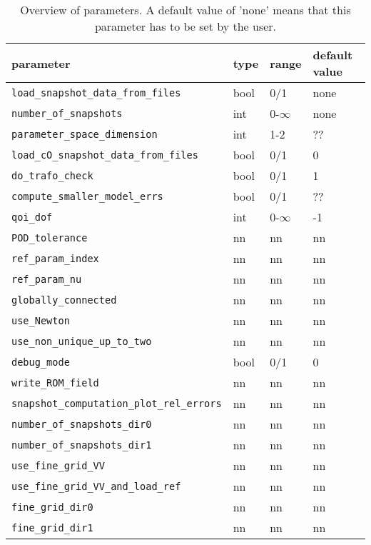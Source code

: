 \documentclass[a4paper,10pt]{article}
\begin{document}
\begin{table}
\centering
\begin{tabular}{| l | l | l | l|}  
\hline
\hline
parameter & type & range  & default value \\
\hline
 \verb|load_snapshot_data_from_files|  & bool  & 0/1 & none \\%
 \verb|number_of_snapshots|  & int  & 0-$\infty$ & none \\%
 \verb|parameter_space_dimension|  & int  & 1-2 & ?? \\%
 \verb|load_cO_snapshot_data_from_files| & bool & 0/1 & 0 \\
 \verb|do_trafo_check| & bool & 0/1 & 1 \\
 \verb|compute_smaller_model_errs| &  bool & 0/1 & ?? \\
 \verb|qoi_dof|  & int  & 0-$\infty$ & -1 \\%
 \verb|POD_tolerance|  & nn  & nn & nn \\%
 \verb|ref_param_index| & nn  & nn & nn \\%
 \verb|ref_param_nu| & nn  & nn & nn \\%
 \verb|globally_connected| & nn  & nn & nn \\%
 \verb|use_Newton| & nn  & nn & nn \\%
 \verb|use_non_unique_up_to_two| & nn  & nn & nn \\%
 \verb|debug_mode| & bool  & 0/1 & 0 \\%
 \verb|write_ROM_field| & nn  & nn & nn \\%
 \verb|snapshot_computation_plot_rel_errors| & nn  & nn & nn \\%
 \verb|number_of_snapshots_dir0| & nn  & nn & nn \\%
 \verb|number_of_snapshots_dir1| & nn  & nn & nn \\%
 \verb|use_fine_grid_VV| & nn  & nn & nn \\%
 \verb|use_fine_grid_VV_and_load_ref| & nn  & nn & nn \\%
 \verb|fine_grid_dir0| & nn  & nn & nn \\%
 \verb|fine_grid_dir1| & nn  & nn & nn \\%
\hline
\hline
\end{tabular}
\caption{Overview of parameters. A default value of 'none' means that this parameter has to be set by the user.}
\label{table:parameter_overview}
\end{table} 
\end{document}
